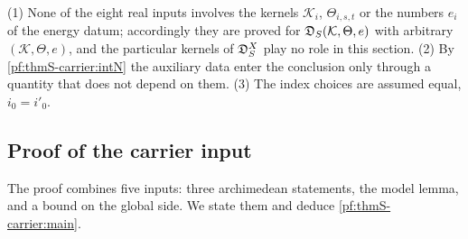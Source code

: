 \begin{remark}\label{pf:thmS-carrier:rem-statement}
(1) None of the eight real inputs involves the kernels $\mathcal K_i$, $\Theta_{i,s,t}$ or the numbers $e_i$ of the energy
datum; accordingly they are proved for $\mathfrak{D}_S(\mathcal K,\Theta,e)$ with arbitrary $(\mathcal K,\Theta,e)$, and
the particular kernels of $\mathfrak{D}^X_S$ play no role in this section. (2) By \cref{pf:thmS-carrier:intN} the
auxiliary data enter the conclusion only through a quantity that does not depend on them. (3) The index choices are
assumed equal, $i_0=i'_0$.
\end{remark}

\subsection{Proof of the carrier input}\label{sec:pf:thmS-carrier:assembly}

The proof combines five inputs: three archimedean statements, the model lemma, and a bound on the global side. We state
them and deduce \cref{pf:thmS-carrier:main}.


